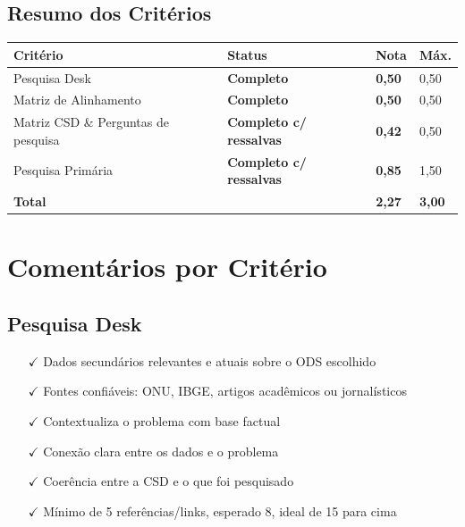 \documentclass[
  sigconf,
  nonacm, %
  language=portuguese
]{acmart}
\newcommand{\statusok}[1]{{\small\bfseries\color{cgood}#1}}
\newcommand{\statuswarn}[1]{{\small\bfseries\color{cwarn}#1}}
\begin{document}
\subsection{Resumo dos Critérios}

\begin{tabular}{@{} L{2.6cm} C{2.5cm} C{1.1cm} C{1.1cm} @{}}
\toprule
\textbf{Critério} & \textbf{Status} & \textbf{Nota} & \textbf{Máx.} \\
\midrule
Pesquisa Desk & \statusok{Completo} & \textbf{0,50} & 0,50 \\
Matriz de Alinhamento & \statusok{Completo} & \textbf{0,50} & 0,50 \\
Matriz CSD \& Perguntas de pesquisa & \statuswarn{Completo c/ ressalvas} & \textbf{0,42} & 0,50 \\
Pesquisa Primária & \statuswarn{Completo c/ ressalvas} & \textbf{0,85} & 1,50 \\
\midrule
\textbf{Total} & & \textbf{\color{cred}2,27} & \textbf{3,00} \\
\bottomrule
\end{tabular}

\section{Comentários por Critério}

\subsection{Pesquisa Desk}

\noindent\statusok{0,50\,/\,0,50 pts · Completo}

\begin{itemize}[leftmargin=14pt,itemsep=1pt,topsep=3pt,parsep=0pt]
  \item[\textcolor{cgood}{$\checkmark$}] {\small\textcolor{cgood}{Dados secundários relevantes e atuais sobre o ODS escolhido}}
  \item[\textcolor{cgood}{$\checkmark$}] {\small\textcolor{cgood}{Fontes confiáveis: ONU, IBGE, artigos acadêmicos ou jornalísticos}}
  \item[\textcolor{cgood}{$\checkmark$}] {\small\textcolor{cgood}{Contextualiza o problema com base factual}}
  \item[\textcolor{cgood}{$\checkmark$}] {\small\textcolor{cgood}{Conexão clara entre os dados e o problema}}
  \item[\textcolor{cgood}{$\checkmark$}] {\small\textcolor{cgood}{Coerência entre a CSD e o que foi pesquisado}}
  \item[\textcolor{cgood}{$\checkmark$}] {\small\textcolor{cgood}{Mínimo de 5 referências/links, esperado 8, ideal de 15 para cima}}
\end{itemize}
\end{document}
